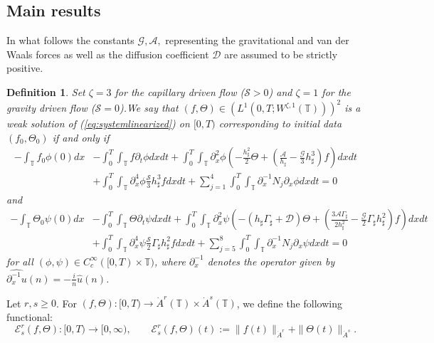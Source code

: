 \documentclass[reqno,11pt]{amsart}
\newcommand{\TT}{{\mathbb T}}
\newcommand{\pat}{\partial_t}
\newcommand{\pax}{\partial_x}
\newcommand{\bh}{h_\sharp}
\newcommand{\bG}{\Gamma_\sharp}
\newtheorem{definition}{Definition}
\begin{document}
\subsection{Main results}
In what follows the constants $\mathcal G,\mathcal A,$ representing the gravitational and van der Waals forces as well as the diffusion coefficient $\mathcal D$ are assumed to be strictly positive.


\begin{definition}\label{defi1}Set $\zeta=3$ for the capillary driven flow ($\mathcal{S}>0$) and $\zeta=1$ for the gravity driven flow ($\mathcal{S}=0$).We say that $(f,\Theta)\in \left(L^1(0,T;W^{\zeta,1}(\TT))\right)^2$ is a weak solution of (\ref{eq:systemlinearized}) on $[0,T)$ corresponding to initial data $(f_0,\Theta_0)$ if and only if
\begin{align*}
-\int_\TT f_0\phi(0)dx&-\int_0^T\int_\TT f\pat\phi dxdt+\int_0^T\int_\TT \pax^2\phi\left(-\frac{\bh^2}{2}\Theta +\left(\frac{\mathcal{A}}{\bh}-\frac{\mathcal{G}}{3}\bh^3\right)f\right)  dxdt\\
&+\int_0^T\int_\TT\pax^4\phi \frac{\mathcal{S}}{3}\bh^3f dxdt+\sum_{j=1}^4\int_0^T\int_\TT  \partial_x^{-1}N_j\pax \phi dxdt =0
\end{align*}
and
\begin{align*}
-\int_\TT \Theta_0\psi(0)dx&-\int_0^T\int_\TT \Theta\pat\psi dxdt+\int_0^T\int_\TT \pax^2\psi\left(-\left(\bh\bG+\mathcal{D}\right)\Theta+\left(\frac{3\mathcal{A}\bG}{2\bh^2}-\frac{\mathcal{G}}{2}\bG\bh^2\right)f\right)  dxdt\\
&+\int_0^T\int_\TT\pax^4\psi\frac{\mathcal{S}}{2} \bG\bh^2f dxdt+\sum_{j=5}^8\int_0^T\int_\TT  \partial_x^{-1}N_j\pax \psi dxdt =0
\end{align*}
for all $(\phi,\psi)\in C^{\infty}_c([0,T)\times \TT)$,  where $\pax^{-1}$ denotes the operator given by $\widehat{\pax^{-1}u}(n)=-\frac{i}{n}\hat{u}(n)$. 

\end{definition}

Let $r,s\geq 0$. For $(f,\Theta):[0,T) \to \dot A^r(\TT)\times \dot A^s(\TT)$, we define the following functional:
\begin{equation}\label{energy}
\mathscr{E}^r_{s}(f,\Theta):[0,T) \to [0,\infty),\qquad \mathscr{E}^r_{s}(f,\Theta)(t):=\|f(t)\|_{\dot{A}^r}+\|\Theta(t)\|_{\dot{A}^s}.
\end{equation}

\medskip
\end{document}
